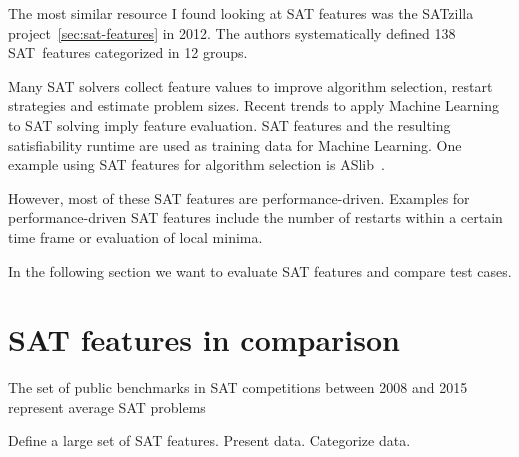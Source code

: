 The most similar resource I found looking at SAT features was the
SATzilla project~\ref{sec:sat-features} in 2012. The authors systematically defined
138 SAT~features categorized in 12 groups.

Many SAT solvers collect feature values to improve algorithm selection,
restart strategies and estimate problem sizes. Recent trends to apply Machine
Learning to SAT solving imply feature evaluation. SAT features and the resulting
satisfiability runtime are used as training data for Machine Learning. One example
using SAT features for algorithm selection is ASlib~\cite{aslib}.

However, most of these SAT features are performance-driven.
Examples for performance-driven SAT features include the number of
restarts within a certain time frame or evaluation of local minima.

In the following section we want to evaluate SAT features and
compare test cases.

\section{SAT features in comparison}

\begin{prop}
  The set of public benchmarks in SAT competitions between 2008 and 2015
  represent average SAT problems
\end{prop}

Define a large set of SAT features.
Present data.
Categorize data.

